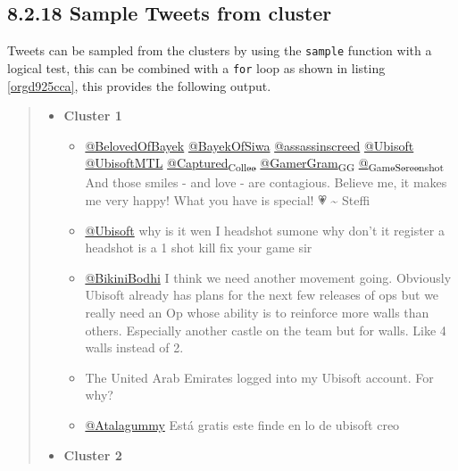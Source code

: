 \documentclass[11pt]{article}
\begin{document}
\subsection{8.2.18 Sample Tweets from cluster}
\label{sec:orgb537b19}
Tweets can be sampled from the clusters by using the \texttt{sample} function with a logical test, this can be combined with a \texttt{for} loop as shown in listing \ref{orgd925cca}, this provides the following output.


\begin{quote}
\begin{itemize}
\item \textbf{Cluster 1}
\begin{itemize}
\item \href{https://twitter.com/search?q=\%40BelovedOfBayek\&src=typed\_query}{@BelovedOfBayek}
 \href{https://twitter.com/search?q=\%40BayekOfSiwa\&src=typed\_query}{@BayekOfSiwa} \href{https://twitter.com/search?q=\%40assassinscreed\&src=typed\_query}{@assassinscreed} \href{https://twitter.com/search?q=\%40Ubisoft\&src=typed\_query}{@Ubisoft} \href{https://twitter.com/search?q=\%40UbisoftMTL\&src=typed\_query}{@UbisoftMTL}
\href{https://twitter.com/search?q=\%40Captured\_Collec\&src=typed\_query}{@Captured\textsubscript{Collec}} \href{https://twitter.com/search?q=\%40GamerGram\_GG\&src=typed\_query}{@GamerGram\textsubscript{GG}} \href{https://twitter.com/search?q=\%40\_GameScreenshot\&src=typed\_query}{@\textsubscript{GameScreenshot}} And those smiles - and
love - are contagious. Believe me, it makes me very happy! What you have is
special! 💗 \textasciitilde{} Steffi
\item \href{https://twitter.com/search?q=\%40Ubisoft}{@Ubisoft} why is it wen I headshot sumone why don’t it register a headshot
is a 1 shot kill fix your game sir
\item \href{https://twitter.com/search?q=\%40BikiniBodhi}{@BikiniBodhi} I think we need another movement going. Obviously Ubisoft
already has plans for the next few releases of ops but we really need an Op
whose ability is to reinforce more walls than others. Especially another
castle on the team but for walls. Like 4 walls instead of 2.
\item The United Arab Emirates logged into my Ubisoft account. For why?
\item \href{https://twitter.com/search?q=\%40Atalagummy}{@Atalagummy} Está gratis este finde en lo de ubisoft creo
\end{itemize}
\item \textbf{Cluster 2}

\end{itemize}
\end{quote}
\end{document}
